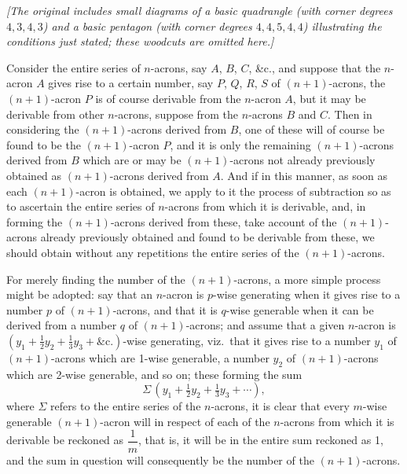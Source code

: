 \documentclass[11pt,a4paper]{article}
\begin{document}
\medskip

\noindent\textit{[The original includes small diagrams of a basic quadrangle (with corner degrees $4,3,4,3$) and a basic pentagon (with corner degrees $4,4,5,4,4$) illustrating the conditions just stated; these woodcuts are omitted here.]}

\medskip

Consider the entire series of $n$-acrons, say $A$, $B$, $C$, \&c., and suppose that the $n$-acron $A$ gives rise to a certain number, say $P$, $Q$, $R$, $S$ of $(n+1)$-acrons, the $(n+1)$-acron $P$ is of course derivable from the $n$-acron $A$, but it may be derivable from other $n$-acrons, suppose from the $n$-acrons $B$ and $C$. Then in considering the $(n+1)$-acrons derived from $B$, one of these will of course be found to be the $(n+1)$-acron $P$, and it is only the remaining $(n+1)$-acrons derived from $B$ which are or may be $(n+1)$-acrons not already previously obtained as $(n+1)$-acrons derived from $A$. And if in this manner, as soon as each $(n+1)$-acron is obtained, we apply to it the process of subtraction so as to ascertain the entire series of $n$-acrons from which it is derivable, and, in forming the $(n+1)$-acrons derived from these, take account of the $(n+1)$-acrons already previously obtained and found to be derivable from these, we should obtain without any repetitions the entire series of the $(n+1)$-acrons.

For merely finding the number of the $(n+1)$-acrons, a more simple process might be adopted: say that an $n$-acron is $p$-wise generating when it gives rise to a number $p$ of $(n+1)$-acrons, and that it is $q$-wise generable when it can be derived from a number $q$ of $(n+1)$-acrons; and assume that a given $n$-acron is $(y_1+\tfrac{1}{2}y_2+\tfrac{1}{3}y_3+\&\mathrm{c}.)$-wise generating, viz.\ that it gives rise to a number $y_1$ of $(n+1)$-acrons which are 1-wise generable, a number $y_2$ of $(n+1)$-acrons which are 2-wise generable, and so on; these forming the sum
\[
\Sigma\,(y_1+\tfrac{1}{2}y_2+\tfrac{1}{3}y_3+\cdots),
\]
where $\Sigma$ refers to the entire series of the $n$-acrons, it is clear that every $m$-wise generable $(n+1)$-acron will in respect of each of the $n$-acrons from which it is derivable be reckoned as $\dfrac{1}{m}$, that is, it will be in the entire sum reckoned as 1, and the sum in question will consequently be the number of the $(n+1)$-acrons.
\end{document}
